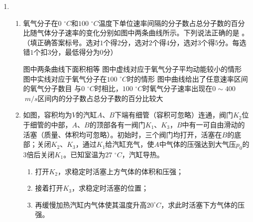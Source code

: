 \begin{enumerate}[leftmargin=0em]
\newpage
\item 
{}
\begin{enumerate}
\renewcommand{\labelenumi}{\arabic{enumi}.}
\item
氧气分子在$ 0 $ $ ^{ \circ } C $和$ 100 $ $ ^{ \circ } C $温度下单位速率间隔的分子数占总分子数的百分比随气体分子速率的变化分别如图中两条曲线所示。下列说法正确的是  。（填正确答案标号。选对$ 1 $个得$ 2 $分，选对$ 2 $个得$ 4 $分，选对$ 3 $个得$ 5 $分。每选错$ 1 $个扣$ 3 $分，最低得分为$ 0 $分）
\begin{figure}[h!]
\centering

\end{figure}


\fivechoices
{图中两条曲线下面积相等}
{图中虚线对应于氧气分子平均动能较小的情形}
{图中实线对应于氧气分子在$ 100 $ $ ^{ \circ } C $时的情形}
{图中曲线给出了任意速率区间的氧气分子数目}
{与$ 0 $ $ ^{ \circ } C $时相比，$ 100 $ $ ^{ \circ } C $时氧气分子速率出现在$ 0 \sim 400 $ $ \ m/s $区间内的分子数占总分子数的百分比较大}



\item 
如图，容积均为$ V $的汽缸$ A $、$ B $下端有细管（容积可忽略）连通，阀门$ K_{2} $位于细管的中部，$ A $、$ B $的顶部各有一阀门$ K_{1} $、$ K_{3} $，$ B $中有一可自由滑动的活塞（质量、体积均可忽略）。初始时，三个阀门均打开，活塞在$ B $的底部；关闭$ K_{2} $、$ K_{3} $，通过$ K_{1} $给汽缸充气，使$ A $中气体的压强达到大气压$ p_{0} $的$ 3 $倍后关闭$ K_{1} $。已知室温为$ 27 $ $ ^{ \circ } C $，汽缸导热。
\begin{enumerate}
\renewcommand{\labelenumi}{\arabic{enumi}.}
\item
打开$ K_{2} $，求稳定时活塞上方气体的体积和压强；
\item 
接着打开$ K_{3} $，求稳定时活塞的位置；
\item 
再缓慢加热汽缸内气体使其温度升高$ 20 ^{ \circ } C $，求此时活塞下方气体的压强。

\end{enumerate}


\end{enumerate}
\end{enumerate}
